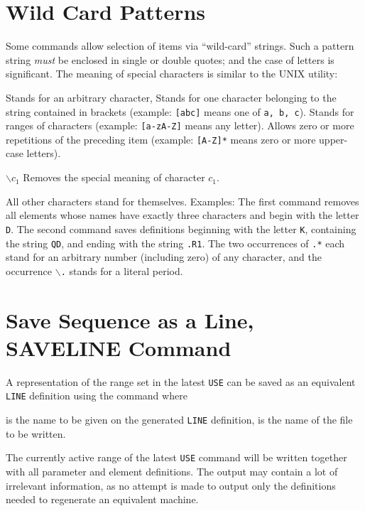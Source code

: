 \section{Wild Card Patterns}
\label{S-WILD}
Some commands allow selection of items via ``wild-card'' strings.
Such a pattern string {\em must} be enclosed in single or double quotes;
and the case of letters is significant.
The meaning of special characters is similar to the UNIX 
utility:
\begin{mylist}
Stands for an arbitrary character,
\ttitem{[\(c_1c_2c_3...\)]}
Stands for one character belonging to the string contained in brackets
(example: {\tt [abc]} means one of {\tt a, b, c}).
\ttitem{[\(c_1-c_2c_3-c_4...\)]}
Stands for ranges of characters
(example: {\tt [a-zA-Z]} means any letter).
\ttitem{*}
Allows zero or more repetitions of the preceding item
(example: {\tt [A-Z]*} means zero or more upper-case letters).
\item[\(\backslash c_1\)]
Removes the special meaning of character \(c_1\).
\end{mylist}
All other characters stand for themselves.
Examples:
The first command removes all elements whose names have exactly three
characters and begin with the letter {\tt D}.
The second command saves definitions beginning with the letter {\tt K},
containing the string {\tt QD}, and ending with the string {\tt .R1}.
The two occurrences of {\tt .*} each stand for an arbitrary
number (including zero) of any character,
and the occurrence {\tt \(\backslash\).} stands for a literal period.
 
\section{Save Sequence as a Line, SAVELINE Command}
A representation of the range set in the latest {\tt USE} can
be saved as an equivalent {\tt LINE} definition using the command
where
\begin{mylist}
is the name to be given on the generated {\tt LINE} definition,
is the name of the file to be written.
\end{mylist}
The currently active range of the latest {\tt USE} command will be
written together with all parameter and element definitions.
The output may contain a lot of irrelevant information,
as no attempt is made to output only the definitions needed to
regenerate an equivalent machine.

